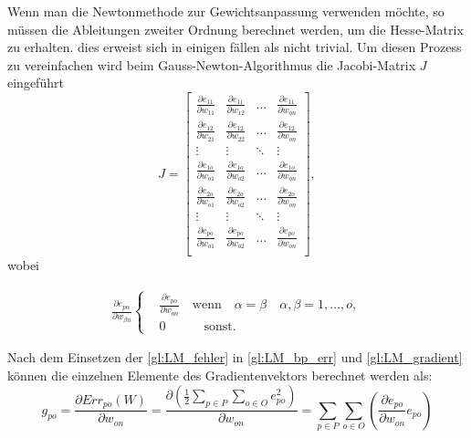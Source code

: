 Wenn man die Newtonmethode zur Gewichtsanpassung verwenden möchte, so müssen die Ableitungen zweiter Ordnung berechnet werden, um die Hesse-Matrix zu erhalten. dies erweist sich in einigen fällen als nicht trivial. Um diesen Prozess zu vereinfachen wird beim Gauss-Newton-Algorithmus die Jacobi-Matrix $J$ eingeführt
\begin{equation}
J
=
 \begin{bmatrix}
    \frac{\partial e_{11}}{\partial w_{11}} & \frac{\partial e_{11}}{\partial w_{12}}  & \dots  & \frac{\partial e_{11}}{\partial w_{on}} \\
    \frac{\partial e_{12}}{\partial w_{21}} & \frac{\partial e_{12}}{\partial w_{22}}  & \dots  & \frac{\partial e_{12}}{\partial w_{on}} \\
    \vdots & \vdots & \ddots & \vdots \\
    \frac{\partial e_{1o}}{\partial w_{o1}} & \frac{\partial e_{1o}}{\partial w_{o2}}  & \dots  & \frac{\partial e_{1o}}{\partial w_{on}} \\
    \frac{\partial e_{2o}}{\partial w_{o1}} & \frac{\partial e_{2o}}{\partial w_{o2}}  & \dots  & \frac{\partial e_{2o}}{\partial w_{on}} \\
    \vdots & \vdots & \ddots & \vdots \\
    \frac{\partial e_{po}}{\partial w_{o1}} & \frac{\partial e_{po}}{\partial w_{o2}}  & \dots  & \frac{\partial e_{po}}{\partial w_{on}} \\
 \end{bmatrix}
,
\end{equation}
wobei

\begin{align}
 \frac{\partial e_{p \alpha}}{\partial w_{\beta n}}
\left \{
\begin{aligned}
& \frac{\partial e_{p o}}{\partial w_{o n}} \quad \text{wenn} \quad \alpha=\beta \quad \alpha,\beta=1,\dots,o, \\
& 0 \quad \qquad \text{sonst}.
\end{aligned}
\right.
\label{gl:LM_fuellen}
\end{align}


Nach dem Einsetzen der \autoref{gl:LM_fehler} in \autoref{gl:LM_bp_err} und \autoref{gl:LM_gradient} können die einzelnen Elemente des Gradientenvektors berechnet werden als:
\begin{equation}
g_{po} = \frac{\partial Err_{po}(W)}{\partial w_{on}} = \frac{\partial \left (\frac{1}{2} \sum_{p \in P} \sum_{o \in O} e_{po}^2 \right )}{\partial w_{on}} 
=
\sum_{p \in P} \sum_{o \in O} \left ( \frac{\partial e_{po}}{\partial w_{on}} e_{po} \right )
\label{gl:LM_g-J}
\end{equation}

